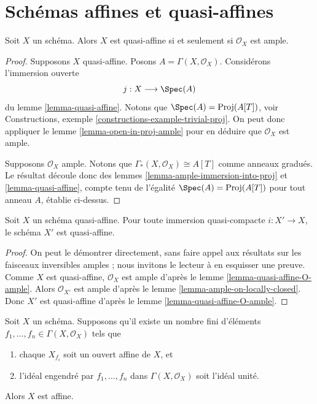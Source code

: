 \section{Schémas affines et quasi-affines}
\label{section-affine-quasi-affine}

\begin{lemma}
\label{lemma-quasi-affine-O-ample}
Soit $X$ un schéma.
Alors $X$ est quasi-affine si et seulement si $\mathcal{O}_X$ est ample.
\end{lemma}

\begin{proof}
Supposons $X$ quasi-affine. Posons $A = \Gamma(X, \mathcal{O}_X)$.
Considérons l'immersion ouverte
$$
j : X \longrightarrow \Spec(A)
$$
du lemme \ref{lemma-quasi-affine}. Notons que
$\Spec(A) = \text{Proj}(A[T])$, voir
Constructions, exemple \ref{constructions-example-trivial-proj}.
On peut donc appliquer le lemme \ref{lemma-open-in-proj-ample}
pour en déduire que $\mathcal{O}_X$ est ample.

\medskip\noindent
Supposons $\mathcal{O}_X$ ample.
Notons que $\Gamma_*(X, \mathcal{O}_X) \cong A[T]$
comme anneaux gradués. Le résultat découle donc des lemmes
\ref{lemma-ample-immersion-into-proj} et \ref{lemma-quasi-affine},
compte tenu de l'égalité
$\Spec(A) = \text{Proj}(A[T])$ pour tout anneau $A$,
établie ci-dessus.
\end{proof}

\begin{lemma}
\label{lemma-quasi-affine-locally-closed}
Soit $X$ un schéma quasi-affine. Pour toute immersion quasi-compacte
$i : X' \to X$, le schéma $X'$ est quasi-affine.
\end{lemma}

\begin{proof}
On peut le démontrer directement, sans faire appel aux résultats sur
les faisceaux inversibles amples ; nous invitons le lecteur à en esquisser une preuve.
Comme $X$ est quasi-affine, $\mathcal{O}_X$ est ample d'après le
lemme \ref{lemma-quasi-affine-O-ample}.
Alors $\mathcal{O}_{X'}$ est ample d'après le
lemme \ref{lemma-ample-on-locally-closed}. Donc $X'$ est quasi-affine d'après le
lemme \ref{lemma-quasi-affine-O-ample}.
\end{proof}

\begin{lemma}
\label{lemma-characterize-affine}
Soit $X$ un schéma. Supposons qu'il existe un nombre fini d'éléments
$f_1, \ldots, f_n \in \Gamma(X, \mathcal{O}_X)$ tels que
\begin{enumerate}
\item chaque $X_{f_i}$ soit un ouvert affine de $X$, et
\item l'idéal engendré par $f_1, \ldots, f_n$ dans
$\Gamma(X, \mathcal{O}_X)$ soit l'idéal unité.
\end{enumerate}
Alors $X$ est affine.
\end{lemma}

